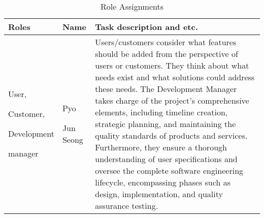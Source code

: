 \documentclass[conference]{IEEEtran}
\begin{document}
\begin{table}[h] \\
\caption{Role Assignments}
\def\arraystretch{1.24} \small

\begin{tabular}{|p{1.5cm}|p{1.2cm}|p{4.9cm}|}
    \hline
    Roles & Name & Task description and etc. \\ 
    \hline
    User, \par Customer,\par Development \par manager & Pyo \par Jun Seong & Users/customers consider what features should be added from the perspective of users or customers. They think about what needs exist and what solutions could address these needs.
    The Development Manager takes charge of the project's comprehensive elements, including timeline creation, strategic planning, and maintaining the quality standards of products and services. Furthermore, they ensure a thorough understanding of user specifications and oversee the complete software engineering lifecycle, encompassing phases such as design, implementation, and quality assurance testing.\\
    \hline
\end{tabular}
\end{table}
\end{document}

